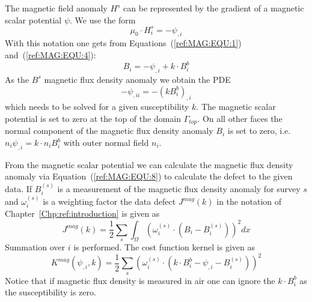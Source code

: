 The magnetic field anomaly $H^s$ can be represented by the gradient of a
magnetic scalar potential $\psi$.
We use the form 
\begin{equation}\label{ref:MAG:EQU:6}
\mu_0  \cdot H^s_i = - \psi_{,i}
\end{equation}
With this notation one gets from Equations~(\ref{ref:MAG:EQU:1}) and~(\ref{ref:MAG:EQU:4}):
\begin{equation}\label{ref:MAG:EQU:7}
B_i = - \psi_{,i}  + k \cdot B^b_i
\end{equation}
As the $B^s$ magnetic flux density anomaly we obtain the PDE
\begin{equation}\label{ref:MAG:EQU:8}
- \psi_{,ii} = - (k B^b_i)_{,i} 
\end{equation} 
which needs to be solved for a given susceptibility $k$.
The magnetic scalar potential is set to zero at the top of the domain
$\Gamma_{top}$.
On all other faces the normal component of the magnetic flux density anomaly
$B_i$ is set to zero, i.e. $n_i \psi_{,i} = k \cdot n_i  B^b_i$ with outer
normal field $n_i$.

From the magnetic scalar potential we can calculate the magnetic flux density
anomaly via Equation~(\ref{ref:MAG:EQU:8}) to calculate the defect to the given
data.
If $B^{(s)}_i$ is a measurement of the magnetic flux density anomaly for
survey $s$ and $\omega^{(s)}_i$ is a weighting factor the data defect
$J^{mag}(k)$ in the notation of Chapter~\ref{Chp:ref:introduction} is given as
\begin{equation}\label{ref:MAG:EQU:9}
J^{mag}(k) = \frac{1}{2}\sum_{s} \int_{\Omega} ( \omega^{(s)}_i \cdot (B_{i}- B^{(s)}_i) ) ^2 dx
\end{equation} 
Summation over $i$ is performed.
The cost function kernel is given as
\begin{equation}\label{ref:MAG:EQU:10}
K^{mag}(\psi_{,i},k) = \frac{1}{2}\sum_{s} ( \omega^{(s)}_i \cdot (k \cdot B^b_i - \psi_{,i} - B^{(s)}_i) ) ^2
\end{equation} 
Notice that if magnetic flux density is measured in air one can ignore the
$k\cdot B^b_i$ as the susceptibility is zero.

